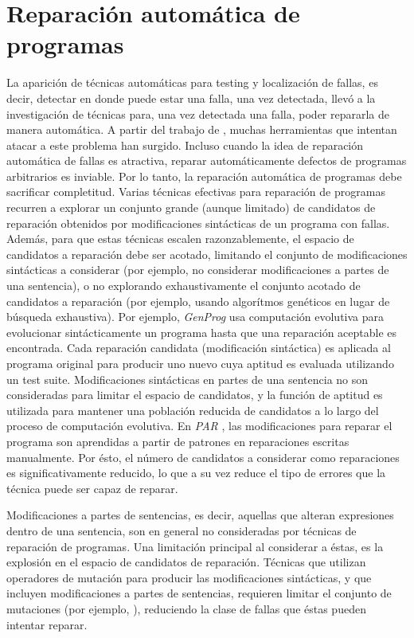 \chapter[Reparaci\'on]{Reparaci\'on autom\'atica de programas}
\label{cap:preliminares.repair}

La aparici\'on de t\'ecnicas autom\'aticas para testing y localizaci\'on de fallas, es decir, detectar en donde puede estar una falla, una vez detectada, llev\'o a la investigaci\'on de t\'ecnicas para, una vez detectada una falla, poder repararla de manera autom\'atica. A partir del trabajo de \cite{bibliography.repair.ArcuriY08}, muchas herramientas que intentan atacar a este problema han surgido. Incluso cuando la idea de reparaci\'on autom\'atica de fallas es atractiva, reparar autom\'aticamente defectos de programas arbitrarios es inviable. Por lo tanto, la reparaci\'on autom\'atica de programas debe sacrificar completitud. Varias t\'ecnicas efectivas para reparaci\'on de programas recurren a explorar un conjunto grande (aunque limitado) de candidatos de reparaci\'on obtenidos por modificaciones sint\'acticas de un programa con fallas. Adem\'as, para que estas t\'ecnicas escalen razonzablemente, el espacio de candidatos a reparaci\'on debe ser acotado, limitando el conjunto de modificaciones sint\'acticas a considerar (por ejemplo, no considerar modificaciones a partes de una sentencia), o no explorando exhaustivamente el conjunto acotado de candidatos a reparaci\'on (por ejemplo, usando algor\'itmos gen\'eticos en lugar de b\'usqueda exhaustiva). Por ejemplo, \emph{GenProg} \cite{bibliography.repair.GouesNFW12} usa computaci\'on evolutiva para evolucionar sint\'acticamente un programa hasta que una reparaci\'on aceptable es encontrada. Cada reparaci\'on candidata (modificaci\'on sint\'actica) es aplicada al programa original para producir uno nuevo cuya aptitud es evaluada utilizando un test suite. Modificaciones sint\'acticas en partes de una sentencia no son consideradas para limitar el espacio de candidatos, y la funci\'on de aptitud es utilizada para mantener una poblaci\'on reducida de candidatos a lo largo del proceso de computaci\'on evolutiva. En \emph{PAR} \cite{bibliography.repair.KimNSK13}, las modificaciones para reparar el programa son aprendidas a partir de patrones en reparaciones escritas manualmente. Por \'esto, el n\'umero de candidatos a considerar como reparaciones es significativamente reducido, lo que a su vez reduce el tipo de errores que la t\'ecnica puede ser capaz de reparar.

Modificaciones a partes de sentencias, es decir, aquellas que alteran expresiones dentro de una sentencia, son en general no consideradas por t\'ecnicas de reparaci\'on de programas. Una limitaci\'on principal al considerar a \'estas, es la explosi\'on en el espacio de candidatos de reparaci\'on. T\'ecnicas que utilizan operadores de mutaci\'on para producir las modificaciones sint\'acticas, y que incluyen modificaciones a partes de sentencias, requieren limitar el conjunto de mutaciones (por ejemplo, \cite{bibliography.repair.GopinathMK11}), reduciendo la clase de fallas que \'estas pueden intentar reparar.

